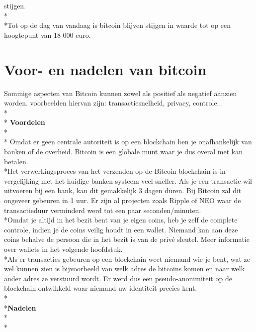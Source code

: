 \documentclass[fleqn,a4paper,12pt]{book}
\begin{document}
stijgen.\\*\\*Tot op de dag van vandaag is bitcoin blijven stijgen in waarde tot op een hoogtepunt van 18 000 euro.
~\autocite{hist1}

\section{Voor- en nadelen van bitcoin}
Sommige aspecten van Bitcoin kunnen zowel als positief als negatief aanzien worden. voorbeelden hiervan zijn: transactiesnelheid, privacy, controle...
\\*\\*
\textbf{Voordelen}\\*\\*
Omdat er geen centrale autoriteit is op een blockchain ben je onafhankelijk van banken of de overheid. Bitcoin is een globale munt waar je dus overal met kan betalen.\\*Het verwerkingsproces van het verzenden op de Bitcoin blockchain is in vergelijking met het huidige banken systeem veel sneller. Als je een transactie wil uitvoeren bij een bank, kan dit gemakkelijk 3 dagen duren. Bij Bitcoin zal dit ongeveer gebeuren in 1 uur. Er zijn al projecten zoals Ripple of NEO waar de transactieduur verminderd werd tot een paar seconden/minuten.\\*Omdat je altijd in het bezit bent van je eigen coins, heb je zelf de complete controle, indien je de coins veilig houdt in een wallet. Niemand kan aan deze coins behalve de persoon die in het bezit is van de privé sleutel. Meer informatie over wallets in het volgende hoofdstuk.\\*Als er transacties gebeuren op een blockchain weet niemand wie je bent, wat ze wel kunnen zien is bijvoorbeeld van welk adres de bitcoins komen en naar welk ander adres ze verstuurd wordt. Er werd dus een pseudo-anonimiteit op de blockchain ontwikkeld waar niemand uw identiteit precies kent.
\\*\\*\textbf{Nadelen}\\*\\*
\end{document}
